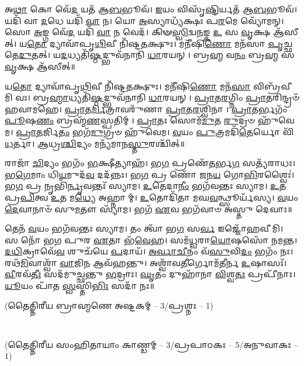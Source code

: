 𑌅\-\ul{𑌥𑌾} 𑌕𑍋 𑌵𑍇᳴\-\ul{𑌦} 𑌯𑌤᳴ 𑌆\-\ul{𑌬}\-𑌭𑍂𑌵᳴।
\-\ul{𑌇}\-𑌯𑌂 𑌵𑌿𑌸𑍃᳴\-\ul{𑌷𑍍𑌟𑌿}\-𑌰𑍍𑌯𑌤᳴ 𑌆\-\ul{𑌬}\-𑌭𑍂𑌵᳴।
𑌯𑌦𑌿᳴ 𑌵𑌾 \ul{𑌦}\-𑌧𑍇 𑌯𑌦𑌿᳴ \ul{𑌵𑌾} 𑌨।
𑌯𑍋 \ul{𑌅}\-𑌸𑍍𑌯𑌾𑌧𑍍𑌯᳴𑌕𑍍𑌷𑌃 𑌪\-\ul{𑌰}\-𑌮𑍇 𑌵𑍍𑌯𑍋᳴𑌮𑌨𑍍।
𑌸𑍋 \ul{𑌅}\-𑌙𑍍𑌗 𑌵𑍇᳴\-\ul{𑌦} 𑌯𑌦𑌿᳴ \ul{𑌵𑌾} 𑌨 𑌵𑍇𑌦᳴।
𑌕𑌿𑍟\-\ul{𑌸𑍍𑌵𑌿}\-𑌦𑍍𑌵\-\ul{𑌨}\-𑌙𑍍𑌕 \ul{𑌉} 𑌸 \ul{𑌵𑍃}\-𑌕𑍍𑌷 𑌆᳴𑌸𑍀𑌤𑍍।
𑌯\-\ul{𑌤𑍋} 𑌦𑍍𑌯𑌾𑌵𑌾᳴𑌪𑍃\-\ul{𑌥𑌿}\-𑌵𑍀 𑌨𑌿᳴𑌷𑍍𑌟\-\ul{𑌤}\-𑌕𑍍𑌷𑍁𑌃।
𑌮𑌨𑍀᳴𑌷𑌿\-\ul{𑌣𑍋} 𑌮𑌨᳴𑌸𑌾 \ul{𑌪𑍃}\-𑌚𑍍𑌛𑌤𑍇\-\ul{𑌦𑍁}\-𑌤𑌤𑍍।
𑌯\-\ul{𑌦}\-𑌧𑍍𑌯𑌤𑌿᳴\-\ul{𑌷𑍍𑌠}\-𑌦𑍍𑌭𑍁𑌵᳴𑌨𑌾𑌨𑌿 \ul{𑌧𑌾}\-𑌰𑌯𑌨𑍍।
𑌬𑍍𑌰\-\ul{𑌹𑍍𑌮} 𑌵\-\ul{𑌨𑌂} 𑌬𑍍𑌰\-\ul{𑌹𑍍𑌮} 𑌸 \ul{𑌵𑍃}\-𑌕𑍍𑌷 𑌆᳴𑌸𑍀𑌤𑍍॥


𑌯\-\ul{𑌤𑍋} 𑌦𑍍𑌯𑌾𑌵𑌾᳴𑌪𑍃\-\ul{𑌥𑌿}\-𑌵𑍀 𑌨𑌿᳴𑌷𑍍𑌟\-\ul{𑌤}\-𑌕𑍍𑌷𑍁𑌃।
𑌮𑌨𑍀᳴𑌷𑌿\-\ul{𑌣𑍋} 𑌮𑌨᳴\-\ul{𑌸𑌾} 𑌵𑌿𑌬𑍍𑌰᳴𑌵𑍀𑌮𑌿 𑌵𑌃।
𑌬𑍍𑌰\-\ul{𑌹𑍍𑌮𑌾}\-𑌧𑍍𑌯𑌤𑌿᳴\-\ul{𑌷𑍍𑌠}\-𑌦𑍍𑌭𑍁𑌵᳴𑌨𑌾𑌨𑌿 \ul{𑌧𑌾}\-𑌰𑌯𑌨𑍍।
\-\ul{𑌪𑍍𑌰𑌾}\-𑌤\-\ul{𑌰}\-𑌗𑍍𑌨𑌿𑌂 \ul{𑌪𑍍𑌰𑌾}\-𑌤𑌰𑌿𑌨𑍍𑌦𑍍𑌰𑍞᳴ 𑌹𑌵𑌾𑌮𑌹𑍇।
\-\ul{𑌪𑍍𑌰𑌾}\-𑌤\-\ul{𑌰𑍍𑌮𑌿}\-𑌤𑍍𑌰𑌾𑌵𑌰𑍁᳴𑌣𑌾 \ul{𑌪𑍍𑌰𑌾}\-𑌤\-\ul{𑌰}\-𑌶𑍍𑌵𑌿𑌨𑌾।
\-\ul{𑌪𑍍𑌰𑌾}\-𑌤𑌰𑍍𑌭𑌗𑌂᳴ \ul{𑌪𑍂}\-𑌷\-\ul{𑌣𑌂} 𑌬𑍍𑌰𑌹𑍍𑌮᳴\-\ul{𑌣}\-𑌸𑍍𑌪𑌤𑌿𑌮𑍍।
\-\ul{𑌪𑍍𑌰𑌾}\-𑌤𑌃 𑌸𑍋𑌮᳴\-\ul{𑌮𑍁}\-𑌤 \ul{𑌰𑍁}\-𑌦𑍍𑌰𑍞 𑌹𑍁᳴𑌵𑍇𑌮।
\-\ul{𑌪𑍍𑌰𑌾}\-\-\ul{𑌤}\-𑌰𑍍𑌜𑌿\-\ul{𑌤𑌂} 𑌭𑌗᳴\-\ul{𑌮𑍁}\-𑌗𑍍𑌰𑍞 𑌹𑍁᳴𑌵𑍇𑌮।
\-\ul{𑌵}\-𑌯𑌂 \ul{𑌪𑍁}\-𑌤𑍍𑌰𑌮𑌦𑌿᳴\-\ul{𑌤𑍇}\-𑌰𑍍𑌯𑍋 𑌵𑌿᳴\-\ul{𑌧}\-𑌰𑍍𑌤𑌾।
\-\ul{𑌆}\-𑌧𑍍𑌰\-\ul{𑌶𑍍𑌚𑌿}\-𑌦𑍍𑌯𑌂 𑌮𑌨𑍍𑌯᳴𑌮𑌾𑌨\-\ul{𑌸𑍍𑌤𑍁}\-𑌰𑌶𑍍𑌚𑌿᳴𑌤𑍍॥

𑌰𑌾𑌜𑌾᳴ \ul{𑌚𑌿}\-𑌦𑍍𑌯𑌂 𑌭𑌗𑌂᳴ \ul{𑌭}\-𑌕𑍍𑌷𑍀𑌤𑍍𑌯𑌾𑌹᳴।
𑌭\-\ul{𑌗} 𑌪𑍍𑌰𑌣𑍇᳴\-\ul{𑌤}\-𑌰𑍍𑌭\-\ul{𑌗} 𑌸𑌤𑍍𑌯᳴𑌰𑌾𑌧𑌃।
𑌭\-\ul{𑌗𑍇}\-𑌮𑌾𑌂 𑌧𑌿\-\ul{𑌯}\-𑌮𑍁𑌦᳴\-\ul{𑌵} 𑌦𑌦᳴𑌨𑍍𑌨𑌃।
𑌭\-\ul{𑌗} 𑌪𑍍𑌰 𑌣𑍋᳴ 𑌜𑌨\-\ul{𑌯} 𑌗𑍋\-\ul{𑌭𑌿}\-𑌰𑌶𑍍𑌵𑍈𑌃॑।
𑌭\-\ul{𑌗} 𑌪𑍍𑌰 𑌨𑍃𑌭𑌿᳴\-\ul{𑌰𑍍𑌨𑍃}\-𑌵𑌨𑍍𑌤𑌃᳴ 𑌸𑍍𑌯𑌾𑌮।
\-\ul{𑌉}\-𑌤𑍇𑌦𑌾\-\ul{𑌨𑍀𑌂} 𑌭𑌗᳴𑌵𑌨𑍍𑌤𑌃 𑌸𑍍𑌯𑌾𑌮।
\-\ul{𑌉}\-𑌤 𑌪𑍍𑌰\-\ul{𑌪𑌿}\-𑌤𑍍𑌵 \ul{𑌉}\-𑌤 𑌮\-\ul{𑌧𑍍𑌯𑍇} 𑌅𑌹𑍍𑌨𑌾𑌮𑍍।
\-\ul{𑌉}\-𑌤𑍋𑌦𑌿᳴𑌤𑌾 𑌮𑌘\-\ul{𑌵}\-𑌨𑍍𑌥𑍍𑌸𑍂𑌰𑍍𑌯᳴𑌸𑍍𑌯।
\-\ul{𑌵}\-𑌯𑌂 \ul{𑌦𑍇}\-𑌵𑌾𑌨𑌾𑍞᳴ 𑌸𑍁\-\ul{𑌮}\-𑌤𑍗 𑌸𑍍𑌯𑌾᳴𑌮।
𑌭𑌗᳴ \ul{𑌏}\-𑌵 𑌭𑌗᳴𑌵𑌾𑍞 𑌅𑌸𑍍𑌤𑍁 𑌦𑍇𑌵𑌾𑌃॥

𑌤𑍇𑌨᳴ \ul{𑌵}\-𑌯𑌂 𑌭𑌗᳴𑌵𑌨𑍍𑌤𑌃 𑌸𑍍𑌯𑌾𑌮।
𑌤𑌂 𑌤𑍍𑌵𑌾᳴ 𑌭\-\ul{𑌗} 𑌸\-\ul{𑌰𑍍𑌵} 𑌇𑌜𑍍𑌜𑍋᳴𑌹𑌵𑍀𑌮𑌿।
𑌸 𑌨𑍋᳴ 𑌭𑌗 𑌪𑍁𑌰 \ul{𑌏}\-𑌤𑌾 𑌭᳴\-\ul{𑌵𑍇}\-𑌹।
𑌸𑌮᳴\-\ul{𑌧𑍍𑌵}\-𑌰𑌾\-\ul{𑌯𑍋}\-𑌷𑌸𑍋᳴ 𑌨𑌮𑌨𑍍𑌤।
\-\ul{𑌦}\-\-\ul{𑌧𑌿}\-𑌕𑍍𑌰𑌾𑌵𑍇᳴\-\ul{𑌵} 𑌶𑍁𑌚᳴𑌯𑍇 \ul{𑌪}\-𑌦𑌾𑌯᳴।
\-\ul{𑌅}\-\-\ul{𑌰𑍍𑌵𑌾}\-\-\ul{𑌚𑍀}\-𑌨𑌂 𑌵᳴\-\ul{𑌸𑍁}\-𑌵𑌿\-\ul{𑌦𑌂} 𑌭𑌗𑌂᳴ 𑌨𑌃।
𑌰𑌥᳴\-\ul{𑌮𑌿}\-𑌵𑌾𑌶𑍍𑌵𑌾᳴ \ul{𑌵𑌾}\-𑌜𑌿\-\ul{𑌨} 𑌆𑌵᳴𑌹𑌨𑍍𑌤𑍁।
𑌅𑌶𑍍𑌵𑌾᳴𑌵\-\ul{𑌤𑍀}\-𑌰𑍍𑌗𑍋𑌮᳴𑌤𑍀𑌰𑍍𑌨 \ul{𑌉}\-𑌷𑌾𑌸𑌃᳴।
\-\ul{𑌵𑍀}\-𑌰𑌵᳴\-\ul{𑌤𑍀𑌃} 𑌸𑌦᳴𑌮𑍁𑌚𑍍𑌛𑌨𑍍𑌤𑍁 \ul{𑌭}\-𑌦𑍍𑌰𑌾𑌃।
\-\ul{𑌘𑍃}\-𑌤𑌂 𑌦𑍁𑌹𑌾᳴𑌨𑌾 \ul{𑌵𑌿}\-𑌶𑍍𑌵\-\ul{𑌤𑌃} 𑌪𑍍𑌰𑌪𑍀᳴𑌨𑌾𑌃।
\-\ul{𑌯𑍂}\-𑌯𑌂 𑌪𑌾᳴𑌤 \ul{𑌸𑍍𑌵}\-𑌸𑍍𑌤𑌿\-\ul{𑌭𑌿𑌃} 𑌸𑌦𑌾᳴ 𑌨𑌃॥

\centerline{\scriptsize(𑌤𑍈𑌤𑍍𑌤𑌿𑌰𑍀𑌯 𑌬𑍍𑌰𑌾𑌹𑍍𑌮𑌣𑍇 𑌅𑌷𑍍𑌟𑌕𑌮𑍍 -- 3/𑌪𑍍𑌰𑌶𑍍𑌨𑌃 -- 1)}\mbox{}\\[-2em]
\centerline{\scriptsize(𑌤𑍈𑌤𑍍𑌤𑌿𑌰𑍀𑌯 𑌸𑌂𑌹𑌿𑌤𑌾𑌯𑌾𑌂 𑌕𑌾𑌣𑍍𑌡𑌮𑍍 -- 3/𑌪𑍍𑌰𑌪𑌾𑌠𑌕𑌃 -- 5/𑌅𑌨𑍁𑌵𑌾𑌕𑌃 --1)}

